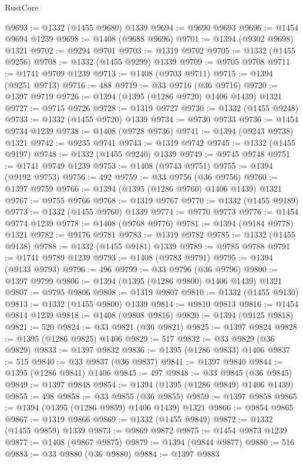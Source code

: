 \begin{lexlean}{RustCore}
\begin{coremodule}
@9693 := @1332 (@1455 @9680) @1339
@9694 := @9690 @9693
@9696 := @1454 @9694 @1239
@9698 := @1408 (@9688 @9696)
@9701 := @1394 (@9302 @9698) @1321
@9702 := @9294 @9701
@9703 := @1319 @9702
@9705 := @1332 (@1455 @9256)
@9708 := @1332 (@1455 @9299) @1339
@9709 := @9705 @9708
@9711 := @1741 @9709 @1239
@9713 := @1408 (@9703 @9711)
@9715 := @1394 (@9251 @9713)
@9716 := 488
@9719 := @33 @9716 (@36 @9716)
@9720 := @1397 @9719
@9726 := @1394 (@1395 (@1286 @9720) @1406 @1439) @1321
@9727 := @9715 @9726
@9728 := @1319 @9727
@9730 := @1332 (@1455 @9248)
@9733 := @1332 (@1455 @9720) @1339
@9734 := @9730 @9733
@9736 := @1454 @9734 @1239
@9738 := @1408 (@9728 @9736)
@9741 := @1394 (@9243 @9738) @1321
@9742 := @9235 @9741
@9743 := @1319 @9742
@9745 := @1332 (@1455 @9197)
@9748 := @1332 (@1455 @9240) @1339
@9749 := @9745 @9748
@9751 := @1741 @9749 @1239
@9753 := @1408 (@9743 @9751)
@9755 := @1394 (@9192 @9753)
@9756 := 492
@9759 := @33 @9756 (@36 @9756)
@9760 := @1397 @9759
@9766 := @1394 (@1395 (@1286 @9760) @1406 @1439) @1321
@9767 := @9755 @9766
@9768 := @1319 @9767
@9770 := @1332 (@1455 @9189)
@9773 := @1332 (@1455 @9760) @1339
@9774 := @9770 @9773
@9776 := @1454 @9774 @1239
@9778 := @1408 (@9768 @9776)
@9781 := @1394 (@9184 @9778) @1321
@9782 := @9176 @9781
@9783 := @1319 @9782
@9785 := @1332 (@1455 @9138)
@9788 := @1332 (@1455 @9181) @1339
@9789 := @9785 @9788
@9791 := @1741 @9789 @1239
@9793 := @1408 (@9783 @9791)
@9795 := @1394 (@9133 @9793)
@9796 := 496
@9799 := @33 @9796 (@36 @9796)
@9800 := @1397 @9799
@9806 := @1394 (@1395 (@1286 @9800) @1406 @1439) @1321
@9807 := @9795 @9806
@9808 := @1319 @9807
@9810 := @1332 (@1455 @9130)
@9813 := @1332 (@1455 @9800) @1339
@9814 := @9810 @9813
@9816 := @1454 @9814 @1239
@9818 := @1408 (@9808 @9816)
@9820 := @1394 (@9125 @9818)
@9821 := 520
@9824 := @33 @9821 (@36 @9821)
@9825 := @1397 @9824
@9828 := @1395 (@1286 @9825) @1406
@9829 := 517
@9832 := @33 @9829 (@36 @9829)
@9833 := @1397 @9832
@9836 := @1395 (@1286 @9833) @1406
@9837 := 515
@9840 := @33 @9837 (@36 @9837)
@9841 := @1397 @9840
@9844 := @1395 (@1286 @9841) @1406
@9845 := 497
@9848 := @33 @9845 (@36 @9845)
@9849 := @1397 @9848
@9854 := @1394 (@1395 (@1286 @9849) @1406 @1439)
@9855 := 498
@9858 := @33 @9855 (@36 @9855)
@9859 := @1397 @9858
@9865 := @1394 (@1395 (@1286 @9859) @1406 @1439) @1321
@9866 := @9854 @9865
@9867 := @1319 @9866
@9869 := @1332 (@1455 @9849)
@9872 := @1332 (@1455 @9859) @1339
@9873 := @9869 @9872
@9875 := @1454 @9873 @1239
@9877 := @1408 (@9867 @9875)
@9879 := @1394 (@9844 @9877)
@9880 := 516
@9883 := @33 @9880 (@36 @9880)
@9884 := @1397 @9883

\end{coremodule}
\end{lexlean}
